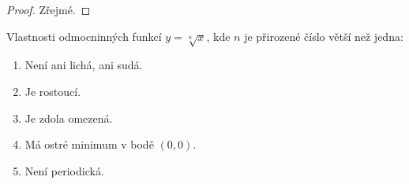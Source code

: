 \begin{proof}
    Zřejmé.
\end{proof}

\begin{veta}
    Vlastnosti odmocninných funkcí $y= \sqrt[n]{x}$, kde $n$ je přirozené číslo větší
    než jedna:
    \begin{enumerate}[$i.$]
        \item Není ani lichá, ani sudá.
       	\item Je rostoucí.
        \item Je zdola omezená.
        \item Má ostré minimum v bodě $(0,0).$
        \item Není periodická.
    \end{enumerate}
\end{veta}
